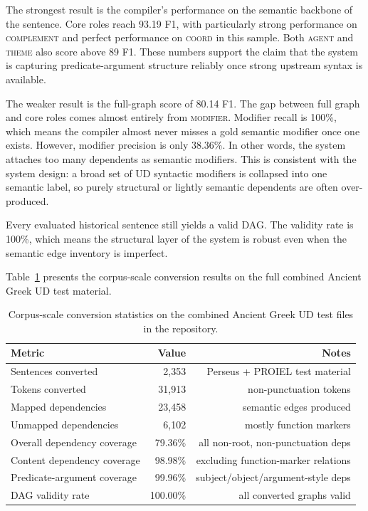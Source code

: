 \documentclass[11pt]{article}
\begin{document}
The strongest result is the compiler's performance on the semantic backbone of
the sentence. Core roles reach 93.19 F1, with particularly strong performance on
\textsc{complement} and perfect performance on \textsc{coord} in this sample.
Both \textsc{agent} and \textsc{theme} also score above 89 F1. These numbers
support the claim that the system is capturing predicate-argument structure
reliably once strong upstream syntax is available.

The weaker result is the full-graph score of 80.14 F1. The gap between full
graph and core roles comes almost entirely from \textsc{modifier}. Modifier
recall is 100\%, which means the compiler almost never misses a gold semantic
modifier once one exists. However, modifier precision is only 38.36\%. In other
words, the system attaches too many dependents as semantic modifiers. This is
consistent with the system design: a broad set of UD syntactic modifiers is
collapsed into one semantic label, so purely structural or lightly semantic
dependents are often over-produced.

Every evaluated historical sentence still yields a valid DAG. The validity rate
is 100\%, which means the structural layer of the system is robust even when the
semantic edge inventory is imperfect.

Table~\ref{tab:coverage-results} presents the corpus-scale conversion results on
the full combined Ancient Greek UD test material.

\begin{table}[t]
\centering
\caption{Corpus-scale conversion statistics on the combined Ancient Greek UD
test files in the repository.}
\label{tab:coverage-results}
\begin{tabular}{lrr}
\toprule
Metric & Value & Notes \\
\midrule
Sentences converted & 2,353 & Perseus + PROIEL test material \\
Tokens converted & 31,913 & non-punctuation tokens \\
Mapped dependencies & 23,458 & semantic edges produced \\
Unmapped dependencies & 6,102 & mostly function markers \\
Overall dependency coverage & 79.36\% & all non-root, non-punctuation deps \\
Content dependency coverage & 98.98\% & excluding function-marker relations \\
Predicate-argument coverage & 99.96\% & subject/object/argument-style deps \\
DAG validity rate & 100.00\% & all converted graphs valid \\
\bottomrule
\end{tabular}
\end{table}
\end{document}
